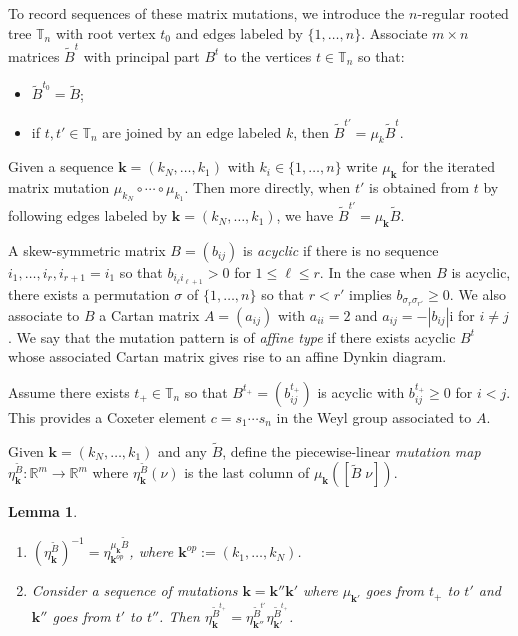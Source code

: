 \documentclass{amsart}
\newtheorem{lemma}[theorem]{Lemma}
\numberwithin{theorem}{section}
\newcommand{\bfk}{{\boldsymbol{k}}}
\newcommand{\RR}{\mathbb{R}}
\newcommand{\TT}{\mathbb{T}}
\begin{document}
  To record sequences of these matrix mutations, we introduce the $n$-regular rooted tree $\TT_n$ with root vertex $t_0$ and edges labeled by $\{1,\ldots,n\}$.
  Associate $m\times n$ matrices $\widetilde{B}^t$ with principal part $B^t$ to the vertices $t\in\TT_n$ so that:
  \begin{itemize}
    \item $\widetilde{B}^{t_0}=\widetilde{B}$;
    \item if $t,t'\in\TT_n$ are joined by an edge labeled $k$, then $\widetilde{B}^{t'}=\mu_k \widetilde{B}^t$.
  \end{itemize}
  Given a sequence $\bfk=(k_N,\ldots,k_1)$ with $k_i\in\{1,\ldots,n\}$ write $\mu_\bfk$ for the iterated matrix mutation $\mu_{k_N}\circ\cdots\circ\mu_{k_1}$.
  Then more directly, when $t'$ is obtained from $t$ by following edges labeled by $\bfk=(k_N,\ldots,k_1)$, we have $\widetilde B^{t'}=\mu_\bfk \widetilde B$.

  A skew-symmetric matrix $B=(b_{ij})$ is \emph{acyclic} if there is no sequence $i_1,\ldots,i_r,i_{r+1}=i_1$ so that $b_{i_\ell i_{\ell+1}}>0$ for $1\le\ell\le r$.
  In the case when $B$ is acyclic, there exists a permutation $\sigma$ of $\{1,\ldots,n\}$ so that $r<r'$ implies $b_{\sigma_r \sigma_{r'}}\ge 0$.
  We also associate to $B$ a Cartan matrix $A=(a_{ij})$ with $a_{ii}=2$ and $a_{ij}=-|b_{ij}|$i for $i\ne j$.
  We say that the mutation pattern is of \emph{affine type} if there exists acyclic $B^t$ whose associated Cartan matrix gives rise to an affine Dynkin diagram.
  
  Assume there exists $t_+\in\TT_n$ so that $B^{t_+}=(b^{t_+}_{ij})$ is acyclic with $b^{t_+}_{ij}\ge 0$ for $i<j$.
  This provides a Coxeter element $c=s_1\cdots s_n$ in the Weyl group associated to $A$.
  
  Given $\bfk=(k_N,\ldots,k_1)$ and any $\widetilde B$, define the piecewise-linear \emph{mutation map} $\eta^{\widetilde B}_\bfk:\RR^m\to\RR^m$ where $\eta^{\widetilde B}_\bfk(\nu)$ is the last column of $\mu_\bfk([\widetilde{B}\;\nu])$.
  \begin{lemma}\mbox{}
    \label{le:mutation maps}
    \begin{enumerate}
      \item $\left(\eta^{\widetilde{B}}_\bfk\right)^{-1}=\eta^{\mu_\bfk\widetilde{B}}_{\bfk^{op}}$, where $\bfk^{op}:=(k_1,\ldots,k_N)$.
      \item Consider a sequence of mutations $\bfk=\bfk''\bfk'$ where $\mu_{\bfk'}$ goes from $t_+$ to $t'$ and $\bfk''$ goes from $t'$ to $t''$.
        Then $\eta^{\widetilde B^{t_+}}_\bfk = \eta^{\widetilde B^{t'}}_{\bfk''}\eta^{\widetilde B^{t_+}}_{\bfk'}$.
    \end{enumerate}
  \end{lemma}
\end{document}
